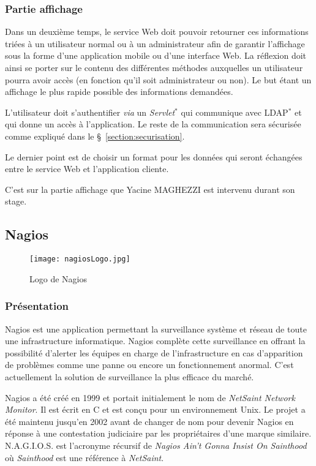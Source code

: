 \subsubsection{Partie affichage}

Dans un deuxi\`eme temps, le service Web doit pouvoir retourner ces informations tri\'ees \`a un utilisateur normal ou \`a un administrateur afin de garantir l'affichage sous la forme d'une application mobile ou d'une interface Web.
La r\'eflexion doit ainsi se porter sur le contenu des diff\'erentes m\'ethodes auxquelles un utilisateur pourra avoir acc\`es (en fonction qu'il soit administrateur ou non).
Le but \'etant un affichage le plus rapide possible des informations demand\'ees.

L'utilisateur doit s'authentifier \textit{via} un \textit{Servlet}$^*$ qui communique avec LDAP$^*$ et qui donne un acc\`es \`a l'application.
Le reste de la communication sera s\'ecuris\'ee comme expliqu\'e dans le \S~\ref{section:securisation}.

Le dernier point est de choisir un format pour les donn\'ees qui seront \'echang\'ees entre le service Web et l'application cliente.

C'est sur la partie affichage que Yacine MAGHEZZI est intervenu durant son stage.

\subsection{Nagios}
\label{section:nagios}

\begin{figure}[!ht]
	\centering
	\texttt{[image: nagiosLogo.jpg]}
	\caption{Logo de Nagios}

\end{figure}

\subsubsection{Pr\'esentation}

Nagios est une application permettant la surveillance syst\`eme et r\'eseau de toute une infrastructure informatique.
Nagios compl\`ete cette surveillance en offrant la possibilit\'e d'alerter les \'equipes en charge de l'infrastructure en cas d'apparition de probl\`emes comme une panne ou encore un fonctionnement anormal.
C'est actuellement la solution de surveillance la plus efficace du march\'e.

Nagios a \'et\'e cr\'e\'e en 1999 et portait initialement le nom de \textit{NetSaint Network Monitor}.
Il est \'ecrit en C et est con\c{c}u pour un environnement Unix.
Le projet a \'et\'e maintenu jusqu'en 2002 avant de changer de nom pour devenir Nagios en r\'eponse \`a une contestation judiciaire par les propri\'etaires d'une marque similaire.
N.A.G.I.O.S. est l'acronyme r\'ecursif de \og{}\textit{Nagios Ain't Gonna Insist On Sainthood}\fg{} o\`u \textit{Sainthood} est une r\'ef\'erence \`a \textit{NetSaint}.

